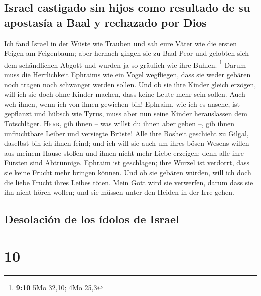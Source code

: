 \hypertarget{israel-castigado-sin-hijos-como-resultado-de-su-apostasuxeda-a-baal-y-rechazado-por-dios}{%
\subsection{Israel castigado sin hijos como resultado de su apostasía a
Baal y rechazado por
Dios}\label{israel-castigado-sin-hijos-como-resultado-de-su-apostasuxeda-a-baal-y-rechazado-por-dios}}

 Ich fand Israel in der Wüste wie Trauben und sah eure
Väter wie die ersten Feigen am Feigenbaum; aber hernach gingen sie zu
Baal-Peor und gelobten sich dem schändlichen Abgott und wurden ja so
gräulich wie ihre Buhlen. \footnote{\textbf{9:10} 5Mo 32,10; 4Mo 25,3}
 Darum muss die Herrlichkeit Ephraims wie ein Vogel
wegfliegen, dass sie weder gebären noch tragen noch schwanger werden
sollen.  Und ob sie ihre Kinder gleich erzögen, will ich
sie doch ohne Kinder machen, dass keine Leute mehr sein sollen. Auch weh
ihnen, wenn ich von ihnen gewichen bin!  Ephraim, wie ich
es ansehe, ist gepflanzt und hübsch wie Tyrus, muss aber nun seine
Kinder herauslassen dem Totschläger.  \textsc{Herr}, gib
ihnen -- was willst du ihnen aber geben --, gib ihnen unfruchtbare
Leiber und versiegte Brüste!  Alle ihre Bosheit geschieht
zu Gilgal, daselbst bin ich ihnen feind; und ich will sie auch um ihres
bösen Wesens willen aus meinem Hause stoßen und ihnen nicht mehr Liebe
erzeigen; denn alle ihre Fürsten sind Abtrünnige. 
Ephraim ist geschlagen; ihre Wurzel ist verdorrt, dass sie keine Frucht
mehr bringen können. Und ob sie gebären würden, will ich doch die liebe
Frucht ihres Leibes töten.  Mein Gott wird sie verwerfen,
darum dass sie ihn nicht hören wollen; und sie müssen unter den Heiden
in der Irre gehen.

\hypertarget{desolaciuxf3n-de-los-uxeddolos-de-israel}{%
\subsection{Desolación de los ídolos de
Israel}\label{desolaciuxf3n-de-los-uxeddolos-de-israel}}

\hypertarget{section-9}{%
\section{10}\label{section-9}}

